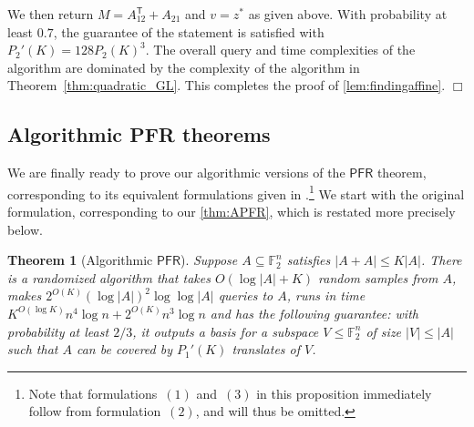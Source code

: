 \documentclass[11pt]{amsart}
\newcommand{\PFR}{\textsf{PFR}}
\newcommand{\tp}{\mathsf{T}}
\theoremstyle{plain}
\newtheorem{theorem}{Theorem}[section]
\theoremstyle{definition}
\theoremstyle{remark}
\renewenvironment{proof}[1][]{
    	\begin{trivlist}
     	\item[\hspace{\labelsep}{\em\noindent Proof#1:\/}]}
     	{{\hfill$\Box$}
    	\end{trivlist}
  }
\begin{document}
\begin{proof}
We then return $M = A_{12}^\tp + A_{21}$ and $v = z^*$ as given above.
With probability at least $0.7$, the guarantee of the statement is satisfied with $P_2'(K) = 128 P_2(K)^3$.
The overall query and time complexities of the algorithm are dominated by the complexity of the algorithm in Theorem~\ref{thm:quadratic_GL}. This completes the proof of \cref{lem:findingaffine}.
\end{proof}


\subsection{Algorithmic PFR theorems}
\label{sec:classical}

We are finally ready to prove our algorithmic versions of the $\PFR$ theorem, corresponding to its equivalent formulations given in \cite[Proposition~10.2]{green2004finite}.\footnote{Note that formulations~$(1)$ and~$(3)$ in this proposition immediately follow from formulation~$(2)$, and will thus be omitted.}
We start with the original formulation, corresponding to our \cref{thm:APFR}, which is restated more precisely below.

\begin{theorem}[Algorithmic $\PFR$]
\label{thm:algoPFR1}
    Suppose $A \subseteq \mathbb{F}_2^n$ satisfies $|A + A| \leq K|A|$.
    There is a randomized algorithm that takes $O(\log|A| + K)$ random samples from $A$, makes $2^{O(K)} (\log |A|)^2 \log\log |A|$ queries to $A$, runs in time $K^{O(\log K)} n^4 \log n + 2^{O(K)} n^3 \log n$ and has the following guarantee:
    with probability at least $2/3$, it outputs a basis for a subspace $V \leq \mathbb{F}_2^n$ of size $|V| \leq |A|$ such that $A$ can be covered by $P_1'(K)$ translates of $V$.
\end{theorem}
\end{document}
